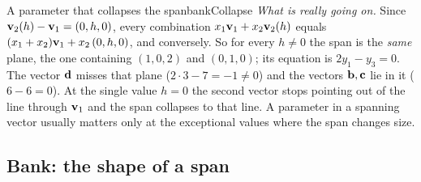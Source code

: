 \documentclass[11pt]{article}
\begin{document}
\begin{exmp}{A parameter that collapses the span}{bankCollapse}
\emph{What is really going on.} Since $\mathbf{v}_2(h)-\mathbf{v}_1=(0,h,0)$, every combination $x_1\mathbf{v}_1+x_2\mathbf{v}_2(h)$ equals $(x_1+x_2)\mathbf{v}_1+x_2\,(0,h,0)$, and conversely. So for every $h\neq0$ the span is the \emph{same} plane, the one containing $(1,0,2)$ and $(0,1,0)$; its equation is $2y_1-y_3=0$. The vector $\mathbf{d}$ misses that plane ($2\cdot3-7=-1\neq0$) and the vectors $\mathbf{b},\mathbf{c}$ lie in it ($6-6=0$). At the single value $h=0$ the second vector stops pointing out of the line through $\mathbf{v}_1$ and the span collapses to that line. A parameter in a spanning vector usually matters only at the exceptional values where the span changes size.
\end{exmp}

\subsection*{Bank: the shape of a span}
\end{document}

